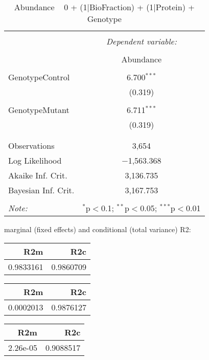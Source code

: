 \documentclass[11pt]{report}
\begin{document}
\begin{table}[!htbp] \centering 
  \caption{Abundance ~ 0 + (1|BioFraction) + (1|Protein) + Genotype} 
  \label{} 
\begin{tabular}{@{\extracolsep{5pt}}lc} 
\\[-1.8ex]\hline 
\hline \\[-1.8ex] 
 & \multicolumn{1}{c}{\textit{Dependent variable:}} \\ 
\cline{2-2} 
\\[-1.8ex] & Abundance \\ 
\hline \\[-1.8ex] 
 GenotypeControl & 6.700$^{***}$ \\ 
  & (0.319) \\ 
  & \\ 
 GenotypeMutant & 6.711$^{***}$ \\ 
  & (0.319) \\ 
  & \\ 
\hline \\[-1.8ex] 
Observations & 3,654 \\ 
Log Likelihood & $-$1,563.368 \\ 
Akaike Inf. Crit. & 3,136.735 \\ 
Bayesian Inf. Crit. & 3,167.753 \\ 
\hline 
\hline \\[-1.8ex] 
\textit{Note:}  & \multicolumn{1}{r}{$^{*}$p$<$0.1; $^{**}$p$<$0.05; $^{***}$p$<$0.01} \\ 
\end{tabular} 
\end{table} 
marginal (fixed effects) and conditional (total variance) R2:

\begin{tabular}{r|r}
\hline
R2m & R2c\\
\hline
0.9833161 & 0.9860709\\
\hline
\end{tabular}

\begin{tabular}{r|r}
\hline
R2m & R2c\\
\hline
0.0002013 & 0.9876127\\
\hline
\end{tabular}

\begin{tabular}{r|r}
\hline
R2m & R2c\\
\hline
2.26e-05 & 0.9088517\\
\hline
\end{tabular}
\end{document}
